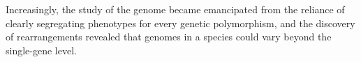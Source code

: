 Increasingly, the study of the genome became emancipated from the reliance of clearly segregating phenotypes for every genetic polymorphism, and the discovery of rearrangements revealed that genomes in a species could vary beyond the single-gene level. %

